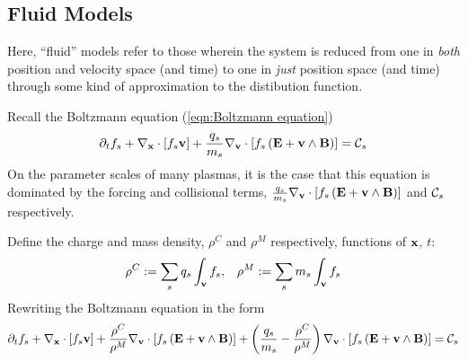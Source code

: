 \subsection*{Fluid Models}
    \begin{definition}
        Here, ``fluid'' models refer to those wherein the system is reduced from one in \emph{both} position and velocity space (and time) to one in \emph{just} position space (and time) through some kind of approximation to the distibution function.
    \end{definition}
    Recall the Boltzmann equation (\ref{eqn:Boltzmann equation})
    \begin{equation*}
        \partial_{t}f_{s} + \nabla_{\mathbf{x}}\cdot[f_{s}\mathbf{v}] + \frac{q_{s}}{m_{s}}\nabla_{\mathbf{v}}\cdot[f_{s}\left(\mathbf{E} + \mathbf{v}\wedge\mathbf{B}\right)]  =  \mathcal{C}_{s}
    \end{equation*}
    On the parameter scales of many plasmas, it is the case that this equation is dominated by the forcing and collisional terms, $\frac{q_{s}}{m_{s}}\nabla_{\mathbf{v}}\cdot[f_{s}\left(\mathbf{E} + \mathbf{v}\wedge\mathbf{B}\right)]$ and $\mathcal{C}_{s}$ respectively.
    
    Define the charge and mass density, $\rho^{C}$ and $\rho^{M}$ respectively, functions of $\mathbf{x}$, $t$:
    \begin{align}
        \rho^{C}  :=  \sum_{s}q_{s}\int_{\mathbf{v}}f_{s},  &&
        \rho^{M}  :=  \sum_{s}m_{s}\int_{\mathbf{v}}f_{s}
    \end{align}
    Rewriting the Boltzmann equation in the form
    {\small \begin{equation}
        \partial_{t}f_{s} + \nabla_{\mathbf{x}}\cdot[f_{s}\mathbf{v}] + \frac{\rho^{C}}{\rho^{M}}\nabla_{\mathbf{v}}\cdot[f_{s}\left(\mathbf{E} + \mathbf{v}\wedge\mathbf{B}\right)] + \left(\frac{q_{s}}{m_{s}} - \frac{\rho^{C}}{\rho^{M}}\right)\nabla_{\mathbf{v}}\cdot[f_{s}\left(\mathbf{E} + \mathbf{v}\wedge\mathbf{B}\right)]  =  \mathcal{C}_{s}
    \end{equation}}

    